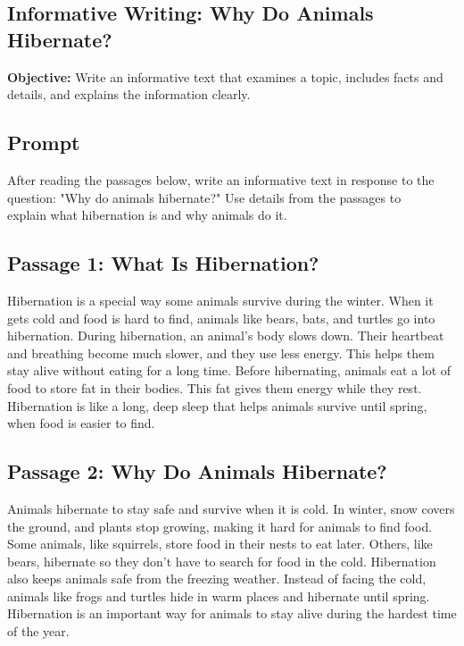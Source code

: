 \documentclass[12pt]{article}
\begin{document}
\subsection*{Informative Writing: Why Do Animals Hibernate?}
\onehalfspacing

\begin{tcolorbox}[colframe=black!40, colback=gray!0, title=Learning Objective]
\textbf{Objective:} Write an informative text that examines a topic, includes facts and details, and explains the information clearly.
\end{tcolorbox}

\subsection*{Prompt}

After reading the passages below, write an informative text in response to the \\question:  
"Why do animals hibernate?"  
Use details from the passages to \\explain what hibernation is and why animals do it.

\subsection*{Passage 1: What Is Hibernation?}

Hibernation is a special way some animals survive during the winter. When it gets cold and food is hard to find, animals like bears, bats, and turtles go into hibernation. During hibernation, an animal's body slows down. Their heartbeat and breathing become much slower, and they use less energy. This helps them stay alive without eating for a long time. Before hibernating, animals eat a lot of food to store fat in their bodies. This fat gives them energy while they rest. Hibernation is like a long, deep sleep that helps animals survive until spring, when food is easier to find.

\subsection*{Passage 2: Why Do Animals Hibernate?}

Animals hibernate to stay safe and survive when it is cold. In winter, snow covers the ground, and plants stop growing, making it hard for animals to find food. Some animals, like squirrels, store food in their nests to eat later. Others, like bears, hibernate so they don’t have to search for food in the cold. Hibernation also keeps animals safe from the freezing weather. Instead of facing the cold, animals like frogs and turtles hide in warm places and hibernate until spring. Hibernation is an important way for animals to stay alive during the hardest time of the year.
\newpage
\end{document}
